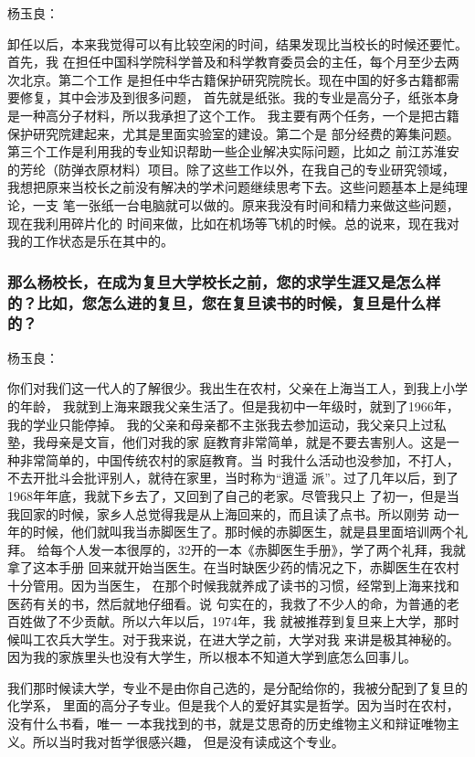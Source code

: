 \documentclass[11pt]{ctexart}
\begin{document}
{{{{杨玉良：

卸任以后，本来我觉得可以有比较空闲的时间，结果发现比当校长的时候还要忙。首先，我
在担任中国科学院科学普及和科学教育委员会的主任，每个月至少去两次北京。第二个工作
是担任中华古籍保护研究院院长。现在中国的好多古籍都需要修复，其中会涉及到很多问题，
首先就是纸张。我的专业是高分子，纸张本身是一种高分子材料，所以我承担了这个工作。
我主要有两个任务，一个是把古籍保护研究院建起来，尤其是里面实验室的建设。第二个是
部分经费的筹集问题。第三个工作是利用我的专业知识帮助一些企业解决实际问题，比如之
前江苏淮安的芳纶（防弹衣原材料）项目。除了这些工作以外，在我自己的专业研究领域，
我想把原来当校长之前没有解决的学术问题继续思考下去。这些问题基本上是纯理论，一支
笔一张纸一台电脑就可以做的。原来我没有时间和精力来做这些问题，现在我利用碎片化的
时间来做，比如在机场等飞机的时候。总的说来，现在我对我的工作状态是乐在其中的。


\subsubsection{那么杨校长，在成为复旦大学校长之前，您的求学生涯又是怎么样的？比如，您怎么进的复旦，您在复旦读书的时候，复旦是什么样的？}
\label{sec:org691476e}


杨玉良：

你们对我们这一代人的了解很少。我出生在农村，父亲在上海当工人，到我上小学的年龄，
我就到上海来跟我父亲生活了。但是我初中一年级时，就到了1966年，我的学业只能停掉。
我的父亲和母亲都不主张我去参加运动，我父亲只上过私塾，我母亲是文盲，他们对我的家
庭教育非常简单，就是不要去害别人。这是一种非常简单的，中国传统农村的家庭教育。当
时我什么活动也没参加，不打人，不去开批斗会批评别人，就待在家里，当时称为“逍遥
派”。过了几年以后，到了1968年年底，我就下乡去了，又回到了自己的老家。尽管我只上
了初一，但是当我回家的时候，家乡人总觉得我是从上海回来的，而且读了点书。所以刚劳
动一年的时候，他们就叫我当赤脚医生了。那时候的赤脚医生，就是县里面培训两个礼拜。
给每个人发一本很厚的，32开的一本《赤脚医生手册》，学了两个礼拜，我就拿了这本手册
回来就开始当医生。在当时缺医少药的情况之下，赤脚医生在农村十分管用。因为当医生，
在那个时候我就养成了读书的习惯，经常到上海来找和医药有关的书，然后就地仔细看。说
句实在的，我救了不少人的命，为普通的老百姓做了不少贡献。所以六年以后，1974年，我
就被推荐到复旦来上大学，那时候叫工农兵大学生。对于我来说，在进大学之前，大学对我
来讲是极其神秘的。因为我的家族里头也没有大学生，所以根本不知道大学到底怎么回事儿。

我们那时候读大学，专业不是由你自己选的，是分配给你的，我被分配到了复旦的化学系，
里面的高分子专业。但是我个人的爱好其实是哲学。因为当时在农村，没有什么书看，唯一
一本我找到的书，就是艾思奇的历史维物主义和辩证唯物主义。所以当时我对哲学很感兴趣，
但是没有读成这个专业。

}}}}
\end{document}
